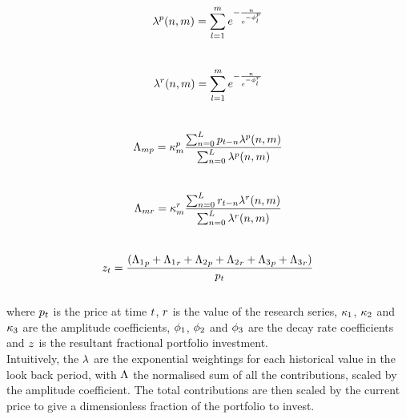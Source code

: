 \documentclass{article}
\begin{document}
\begin{equation}
\lambda^{p}(n,m) = \sum_{l = 1}^{m} e^{- \frac{ n}{e^{-\phi_l^p}}}
\end{equation}\\
\begin{equation}
\lambda^{r}(n,m) = \sum_{l = 1}^{m}  e^{- \frac{ n}{e^{-\phi_l^r}}}
\end{equation}\\
\begin{equation}
\Lambda_{m p} = \kappa_m^p \frac{\sum_{n=0}^{L} p_{t - n} \lambda^{p}(n, m)}{\sum_{n = 0}^{L} \lambda^{p}(n, m)}
\end{equation}\\
\begin{equation}
\Lambda_{m r} = \kappa_m^r \frac{\sum_{n=0}^{L} r_{t - n} \lambda^{r}(n, m)}{\sum_{n = 0}^{L} \lambda^{r}(n, m)}
\end{equation}\\
\begin{equation}
z_{t} = \frac{({\Lambda_{1}}_{p} + {\Lambda_{1}}_{r} + {\Lambda_{2}}_{p} + {\Lambda_{2}}_{r} + {\Lambda_{3}}_{p} + {\Lambda_{3}}_{r})}{p_{t}}
\end{equation}
\\
where $p_t$ is the price at time $t$, $r$ is the value of the research series, $\kappa_{1}$, $\kappa_{2}$ and $\kappa_{3}$ are the amplitude coefficients, $\phi_{1}$, $\phi_{2}$ and $\phi_{3}$  are the decay rate coefficients and $z$ is the resultant fractional portfolio investment.\\
Intuitively, the $\lambda$ are the exponential weightings for each historical value in the look back period, with $\Lambda$ the normalised sum of all the contributions, scaled by the amplitude coefficient. The total contributions are then scaled by the current price to give a dimensionless fraction of the portfolio to invest.
\hspace{200mm}
\hspace{200mm}
\keyterms
\furtherlinks
\end{document}
